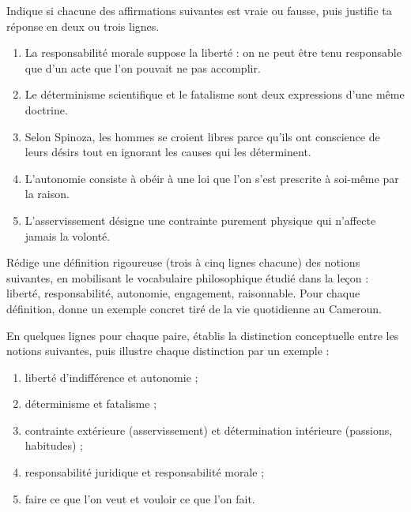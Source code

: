 \documentclass[11pt]{article}
\newcommand{\cle}[1]{{\popxbold\color{popdark}#1}}
\begin{document}
\begin{exercice}
Indique si chacune des affirmations suivantes est vraie ou fausse, puis justifie ta réponse en deux ou trois lignes.
\begin{enumerate}
\item La responsabilité morale suppose la liberté : on ne peut être tenu responsable que d'un acte que l'on pouvait ne pas accomplir.
\item Le déterminisme scientifique et le fatalisme sont deux expressions d'une même doctrine.
\item Selon Spinoza, les hommes se croient libres parce qu'ils ont conscience de leurs désirs tout en ignorant les causes qui les déterminent.
\item L'autonomie consiste à obéir à une loi que l'on s'est prescrite à soi-même par la raison.
\item L'asservissement désigne une contrainte purement physique qui n'affecte jamais la volonté.
\end{enumerate}
\end{exercice}

\begin{exercice}
Rédige une définition rigoureuse (trois à cinq lignes chacune) des notions suivantes, en mobilisant le vocabulaire philosophique étudié dans la leçon : \cle{liberté}, \cle{responsabilité}, \cle{autonomie}, \cle{engagement}, \cle{raisonnable}. Pour chaque définition, donne un exemple concret tiré de la vie quotidienne au Cameroun.
\end{exercice}

\begin{exercice}
En quelques lignes pour chaque paire, établis la distinction conceptuelle entre les notions suivantes, puis illustre chaque distinction par un exemple :
\begin{enumerate}
\item liberté d'indifférence et autonomie ;
\item déterminisme et fatalisme ;
\item contrainte extérieure (asservissement) et détermination intérieure (passions, habitudes) ;
\item responsabilité juridique et responsabilité morale ;
\item faire ce que l'on veut et vouloir ce que l'on fait.
\end{enumerate}
\end{exercice}
\end{document}
